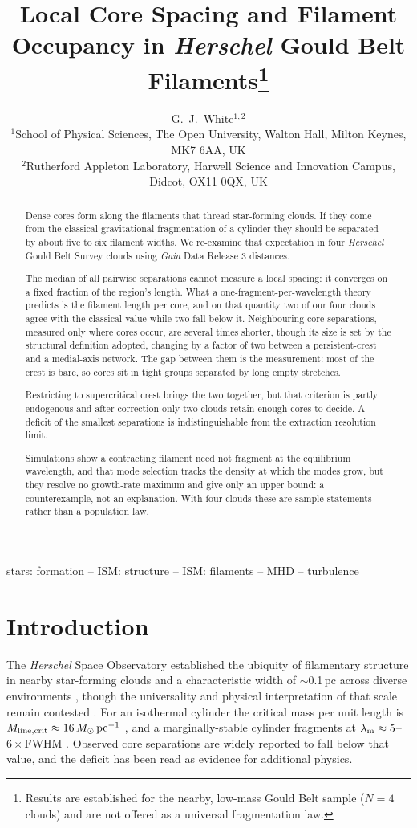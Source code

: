\documentclass[usenatbib,twoside,twocolumn]{mnras}
\title[Core spacing and filament occupancy in HGBS filaments]{Local Core Spacing and Filament Occupancy in \textit{Herschel} Gould Belt Filaments\thanks{Results are established for the nearby, low-mass Gould Belt sample ($N=4$ clouds) and are not offered as a universal fragmentation law.}}
\author[G.~J.~White]{G.~J.~White$^{1,2}$\\
$^{1}$School of Physical Sciences, The Open University, Walton Hall, Milton Keynes, MK7 6AA, UK\\
$^{2}$Rutherford Appleton Laboratory, Harwell Science and Innovation Campus, Didcot, OX11 0QX, UK}
\begin{document}
\maketitle

\begin{abstract}
Dense cores form along the filaments that thread star-forming clouds. If they come from the classical gravitational fragmentation of a cylinder they should be separated by about five to six filament widths. We re-examine that expectation in four \textit{Herschel} Gould Belt Survey clouds using \textit{Gaia} Data Release 3 distances.

The median of all pairwise separations cannot measure a local spacing: it converges on a fixed fraction of the region's length. What a one-fragment-per-wavelength theory predicts is the filament length per core, and on that quantity two of our four clouds agree with the classical value while two fall below it. Neighbouring-core separations, measured only where cores occur, are several times shorter, though its size is set by the structural definition adopted, changing by a factor of two between a persistent-crest and a medial-axis network. The gap between them is the measurement: most of the crest is bare, so cores sit in tight groups separated by long empty stretches.

Restricting to supercritical crest brings the two together, but that criterion is partly endogenous and after correction only two clouds retain enough cores to decide. A deficit of the smallest separations is indistinguishable from the extraction resolution limit.

Simulations show a contracting filament need not fragment at the equilibrium wavelength, and that mode selection tracks the density at which the modes grow, but they resolve no growth-rate maximum and give only an upper bound: a counterexample, not an explanation. With four clouds these are sample statements rather than a population law.
\end{abstract}

\begin{keywords}
stars: formation -- ISM: structure -- ISM: filaments -- MHD -- turbulence
\end{keywords}

\section{Introduction}

The \textit{Herschel} Space Observatory established the ubiquity of filamentary structure in nearby star-forming clouds \citep{Andre2010} and a characteristic width of $\sim$0.1\,pc across diverse environments \citep{Arzoumanian2011}, though the universality and physical interpretation of that scale remain contested \citep{Panopoulou2017,Panopoulou2022}. For an isothermal cylinder the critical mass per unit length is $M_{\rm line,crit}\approx16\,M_\odot\,{\rm pc^{-1}}$ \citep{Ostriker1964}, and a marginally-stable cylinder fragments at $\lambda_{\rm m}\approx5$--$6\times$FWHM \citep{Inutsuka1992,Fischera2012}. Observed core separations are widely reported to fall below that value, and the deficit has been read as evidence for additional physics.
\end{document}

